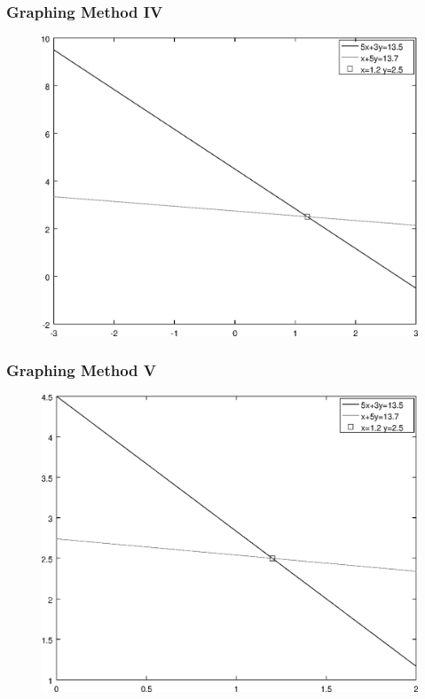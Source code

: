 \documentclass[xcolor=dvipsnames]{beamer}
\begin{document}
\begin{frame}
  \frametitle{Graphing Method IV}
  \begin{figure}[h]
    \includegraphics[scale=.6]{./diagrams/gm-03-SystemsEquations-03.eps}
  \end{figure}
\end{frame}

\begin{frame}
  \frametitle{Graphing Method V}
  \begin{figure}[h]
    \includegraphics[scale=.6]{./diagrams/gm-03-SystemsEquations-04.eps}
  \end{figure}
\end{frame}
\end{document}
